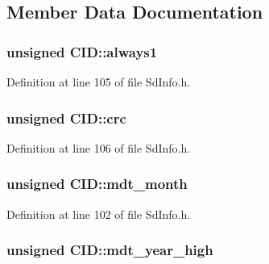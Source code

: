 \subsection{Member Data Documentation}
\subsubsection[{\texorpdfstring{always1}{always1}}]{\setlength{\rightskip}{0pt plus 5cm}unsigned C\+I\+D\+::always1}\hypertarget{struct_c_i_d_af14e08ffbcafb218efae70ad5b8f2c51}{}\label{struct_c_i_d_af14e08ffbcafb218efae70ad5b8f2c51}


Definition at line 105 of file Sd\+Info.\+h.

\subsubsection[{\texorpdfstring{crc}{crc}}]{\setlength{\rightskip}{0pt plus 5cm}unsigned C\+I\+D\+::crc}\hypertarget{struct_c_i_d_a69b946a732f93b7a66aff4002ca00b77}{}\label{struct_c_i_d_a69b946a732f93b7a66aff4002ca00b77}


Definition at line 106 of file Sd\+Info.\+h.

\subsubsection[{\texorpdfstring{mdt\+\_\+month}{mdt\_month}}]{\setlength{\rightskip}{0pt plus 5cm}unsigned C\+I\+D\+::mdt\+\_\+month}\hypertarget{struct_c_i_d_a8b0c4317cc18c03335d7cde147aa8e8d}{}\label{struct_c_i_d_a8b0c4317cc18c03335d7cde147aa8e8d}


Definition at line 102 of file Sd\+Info.\+h.

\subsubsection[{\texorpdfstring{mdt\+\_\+year\+\_\+high}{mdt\_year\_high}}]{\setlength{\rightskip}{0pt plus 5cm}unsigned C\+I\+D\+::mdt\+\_\+year\+\_\+high}\hypertarget{struct_c_i_d_a77cd7bf11f5d63fbcb4b2eec2559b645}{}\label{struct_c_i_d_a77cd7bf11f5d63fbcb4b2eec2559b645}


